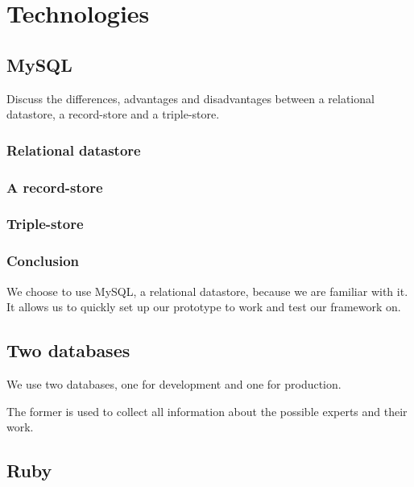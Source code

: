 \section{Technologies}

\subsection{MySQL}

Discuss the differences, advantages and disadvantages between a relational datastore, a record-store and a triple-store.

\subsubsection{Relational datastore}

\subsubsection{A record-store}

\subsubsection{Triple-store}

\subsubsection{Conclusion}

We choose to use MySQL, a relational datastore, because we are familiar with it. It allows us to quickly set up our prototype to work and test our framework on.

\subsection{Two databases}

We use two databases, one for development and one for production.

The former is used to collect all information about the possible experts and their work. 

\subsection{Ruby}
